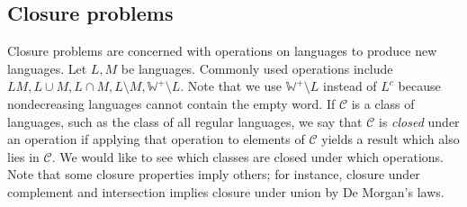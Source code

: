 \subsection{Closure problems}
Closure problems are concerned with operations on languages to produce new languages.
Let \( L, M \) be languages.
Commonly used operations include \( LM, L \cup M, L \cap M, L \setminus M, \mathbb W^+ \setminus L \).
Note that we use \( \mathbb W^+ \setminus L \) instead of \( L^c \) because nondecreasing languages cannot contain the empty word.
If \( \mathcal C \) is a class of languages, such as the class of all regular languages, we say that \( \mathcal C \) is \emph{closed} under an operation if applying that operation to elements of \( \mathcal C \) yields a result which also lies in \( \mathcal C \).
We would like to see which classes are closed under which operations.
Note that some closure properties imply others; for instance, closure under complement and intersection implies closure under union by De Morgan's laws.

